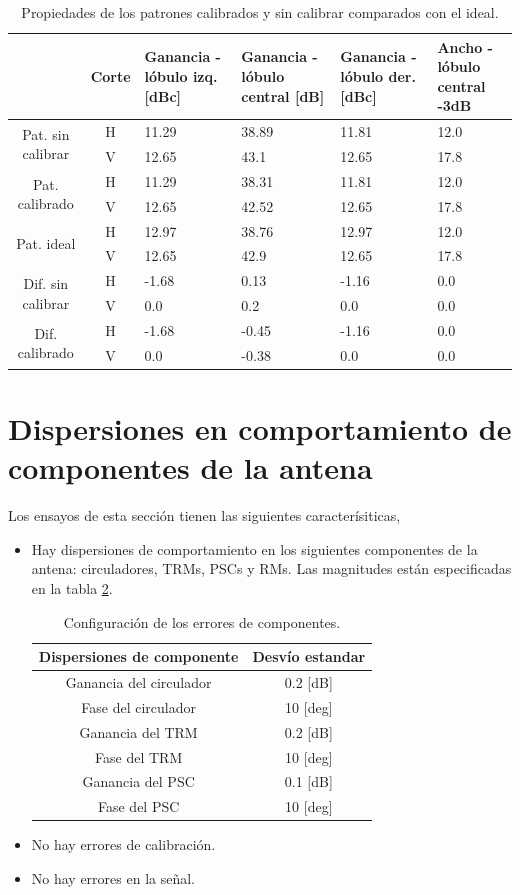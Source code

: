 \begin{table}[H]
  \footnotesize
  \centering
  \begin{tabular}{|c|c|p{2cm}|p{2.5cm}|p{2.5cm}|p{2.5cm}|}
    \cline{2-6}
    \multicolumn{1}{c|}{} & Corte & Ganancia - lóbulo izq. [dBc] & Ganancia - lóbulo central [dB] &
    Ganancia - lóbulo der. [dBc] & Ancho - lóbulo central -3dB \tabularnewline\hline
    \multirow{2}{2cm}{Pat. sin calibrar} & H & 11.29 & 38.89 & 11.81 & 12.0 \tabularnewline\cline{2-6}
     & V & 12.65 & 43.1 & 12.65 & 17.8 \tabularnewline\hline
    \multirow{2}{2cm}{Pat. calibrado} & H & 11.29 & 38.31 & 11.81 & 12.0 \tabularnewline\cline{2-6}
     & V & 12.65 & 42.52 & 12.65 & 17.8 \tabularnewline\hline
    \multirow{2}{2cm}{Pat. ideal} & H & 12.97 & 38.76 & 12.97 & 12.0 \tabularnewline\cline{2-6}
     & V & 12.65 & 42.9 & 12.65 & 17.8 \tabularnewline\hline
    \multirow{2}{2cm}{Dif. sin calibrar} & H & -1.68 & 0.13 & -1.16 & 0.0\tabularnewline\cline{2-6}
     & V & 0.0 & 0.2 & 0.0 & 0.0 \tabularnewline\hline
    \multirow{2}{2cm}{Dif. calibrado} & H & -1.68 & -0.45 & -1.16 & 0.0 \tabularnewline\cline{2-6}
     & V & 0.0 & -0.38 & 0.0 & 0.0 \tabularnewline\hline
  \end{tabular}
  \caption{Propiedades de los patrones calibrados y sin calibrar comparados con el ideal.}
  \label{tab:deadTRMsMutual10degRow}
\end{table}


\section{Dispersiones en comportamiento de componentes de la antena}

Los ensayos de esta sección tienen las siguientes caracterísiticas,
\begin{itemize}
	\item Hay dispersiones de comportamiento en los siguientes componentes de la antena: circuladores, TRMs, PSCs y RMs. Las 
		magnitudes están especificadas en la tabla \ref{tab:errorReferences}.
		\begin{table}[H]
		  \footnotesize
		  \centering
		  \begin{tabular}{|c|c|}
			\hline
			\textbf{Dispersiones de componente} & \textbf{Desvío estandar} \tabularnewline \hline 
			Ganancia del circulador &  0.2 [dB] \tabularnewline\hline 
			Fase del circulador &  10 [deg] \tabularnewline\hline 
			Ganancia del TRM &  0.2 [dB] \tabularnewline\hline 
			Fase del TRM &  10 [deg] \tabularnewline\hline 
			Ganancia del PSC &  0.1 [dB] \tabularnewline\hline 
			Fase del PSC &  10 [deg] \tabularnewline\hline 
		  \end{tabular}
		  \caption{Configuración de los errores de componentes.}
		  \label{tab:errorReferences}
		\end{table}
	\item No hay errores de calibración.
	\item No hay errores en la señal.
\end{itemize}


